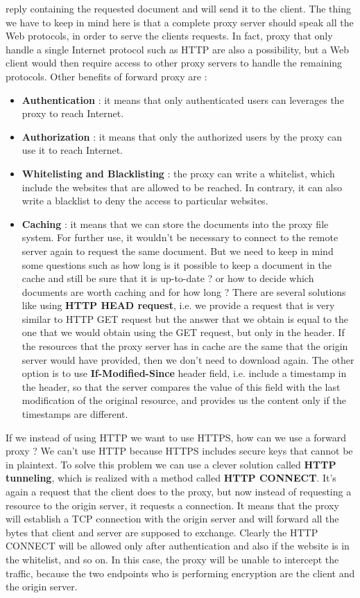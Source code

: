 \documentclass[11pt]{article}
\begin{document}
reply containing the requested document and will send it to the client. The thing we have to keep in mind here is that a complete proxy server should speak all the Web protocols, in order to serve the clients requests. In fact, proxy that only handle a single Internet protocol such as HTTP are also a possibility, but a Web client would then require access to other proxy servers to handle the remaining protocols. Other benefits of forward proxy are : 
\begin{itemize}
\item \textbf{Authentication} : it means that only authenticated users can leverages the proxy to reach Internet.
\item \textbf{Authorization} : it means that only the authorized users by the proxy can use it to reach Internet.
\item \textbf{Whitelisting and Blacklisting} : the proxy can write a whitelist, which include the websites that are allowed to be reached. In contrary, it can also write a blacklist to deny the access to particular websites.
\item \textbf{Caching} : it means that we can store the documents into the proxy file system. For further use, it wouldn't be necessary to connect to the remote server again to request the same document. But we need to keep in mind some questions such as how long is it possible to keep a document in the cache and still be sure that it is up-to-date ? or how to decide which documents are worth caching and for how long ? There are several solutions like using \textbf{HTTP HEAD request}, i.e. we provide a request that is very similar to HTTP GET request but the answer that we obtain is equal to the one that we would obtain using the GET request, but only in the header. If the resources that the proxy server has in cache are the same that the origin server would have provided, then we don't need to download again. The other option is to use \textbf{If-Modified-Since} header field, i.e. include a timestamp in the header, so that the server compares the value of this field with the last modification of the original resource, and provides us the content only if the timestamps are different.
\end{itemize} 
If we instead of using HTTP we want to use HTTPS, how can we use a forward proxy ? We can't use HTTP because HTTPS includes secure keys that cannot be in plaintext. To solve this problem we can use a clever solution called \textbf{HTTP tunneling}, which is realized with a method called \textbf{HTTP CONNECT}. It's again a request that the client does to the proxy, but now instead of requesting a resource to the origin server, it requests a connection. It means that the proxy will establish a TCP connection with the origin server and will forward all the bytes that client and server are supposed to exchange. Clearly the HTTP CONNECT will be allowed only after authentication and also if the website is in the whitelist, and so on. In this case, the proxy will be unable to intercept the traffic, because the two endpoints who is performing encryption are the client and the origin server. 
\end{document}
